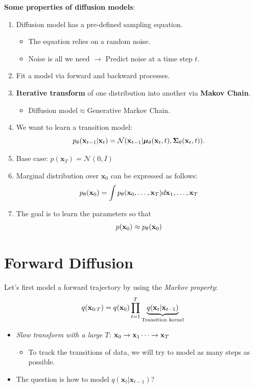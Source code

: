 \textbf{Some properties of diffusion models}:
	\begin{enumerate}
		\item Diffusion model has a pre-defined sampling equation.
			\begin{itemize}
				\item The equation relies on a random noise.
				\item Noise is all we need $\to$ Predict noise at a time step $t$.
			\end{itemize}
		\item Fit a model via forward and backward processes.
		\item \textbf{Iterative transform} of one distribution into another via \textbf{Makov Chain}.
			\begin{itemize}
				\item Diffusion model$\approx$Generative Markov Chain.
			\end{itemize}
		\item We want to learn a transition model:
			$$p_\theta(\mathbf{x}_{t-1}|{\mathbf{x}}_t) = \mathcal{N}(\mathbf{x}_{t-1}|\boldsymbol{\mu}_{\theta}(\mathbf{x}_{t}, t), \boldsymbol{\Sigma}_\theta(\mathbf{x}_t,t)).$$
		\item Base case: $p(\mathbf{x}_T) = \mathcal{N}(0,I)$ 
		\item Marginal distribution over $\mathbf{x}_0$ can be expressed as follows:
			$$p_\theta(\mathbf{x}_0) = \int p_\theta({\mathbf{x}}_0,\dots,\mathbf{x}_T)d{\mathbf{x}}_1,\dots,{\mathbf{x}}_T$$
		\item The goal is to learn the parameters so that
			$$p({\mathbf{x}}_0)\approx p_\theta({\mathbf{x}}_0)$$

	\end{enumerate}

\section{Forward Diffusion}
Let's first model a forward trajectory by using the \textit{Markov property}: 
$$q(\mathbf{x}_{0:T}) = q({\mathbf{x}}_0)\prod^T_{t=1} \underbrace{q(\mathbf{x}_t \vert \mathbf{x}_{t-1})}_{\text{Transition kernel}} $$
\begin{itemize}
	\item \textit{Slow transform with a large} $T$: ${\mathbf{x}}_0\to {\mathbf{x}}_1\cdots\to {\mathbf{x}}_T$
		\begin{itemize}
			\item To track the transitions of data, we will try to model as many steps as possible.
		\end{itemize}
	\item The question is how to model $q(\mathbf{x}_t \vert \mathbf{x}_{t-1})$?
\end{itemize}

